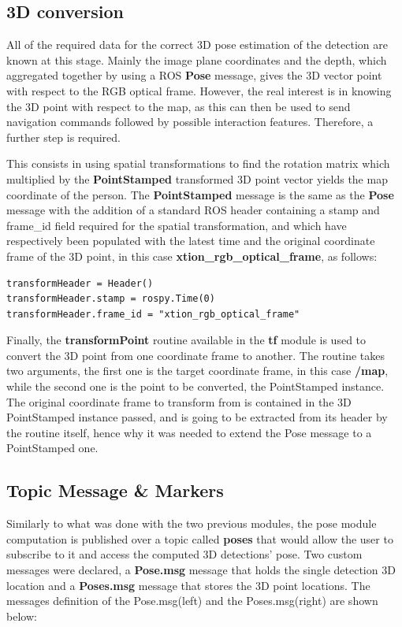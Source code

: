 \subsection{3D conversion}

All of the required data for the correct 3D pose estimation of the detection are known at this stage. Mainly the image plane coordinates and the depth, which aggregated together by using a ROS \textbf{Pose} message, gives the 3D vector point with respect to the RGB optical frame. However, the real interest is in knowing the 3D point with respect to the map, as this can then be used to send navigation commands followed by possible interaction features. Therefore, a further step is required.

This consists in using spatial transformations to find the rotation matrix which multiplied by the \textbf{PointStamped} transformed 3D point vector yields the map coordinate of the person. The \textbf{PointStamped} message is the same as the \textbf{Pose} message with the addition of a standard ROS header containing a stamp and frame\_id field required for the spatial transformation, and which have respectively been populated with the latest time and the original coordinate frame of the 3D point, in this case \textbf{xtion\_rgb\_optical\_frame}, as follows:

\begin{lstlisting}
transformHeader = Header()
transformHeader.stamp = rospy.Time(0)
transformHeader.frame_id = "xtion_rgb_optical_frame"
\end{lstlisting}

Finally, the \textbf{transformPoint} routine available in the \textbf{tf} module is used to convert the 3D point from one coordinate frame to another. The routine takes two arguments, the first one is the target coordinate frame, in this case \textbf{/map}, while the second one is the point to be converted, the PointStamped instance. The original coordinate frame to transform from is contained in the 3D PointStamped instance passed, and is going to be extracted from its header by the routine itself, hence why it was needed to extend the Pose message to a PointStamped one.

\subsection{Topic Message \& Markers}

Similarly to what was done with the two previous modules, the pose module computation is published over a topic called \textbf{poses} that would allow the user to subscribe to it and access the computed 3D detections' pose. Two custom messages were declared, a \textbf{Pose.msg} message that holds the single detection 3D location and a \textbf{Poses.msg} message that stores the 3D point locations. The messages definition of the Pose.msg(left) and the Poses.msg(right) are shown below:

